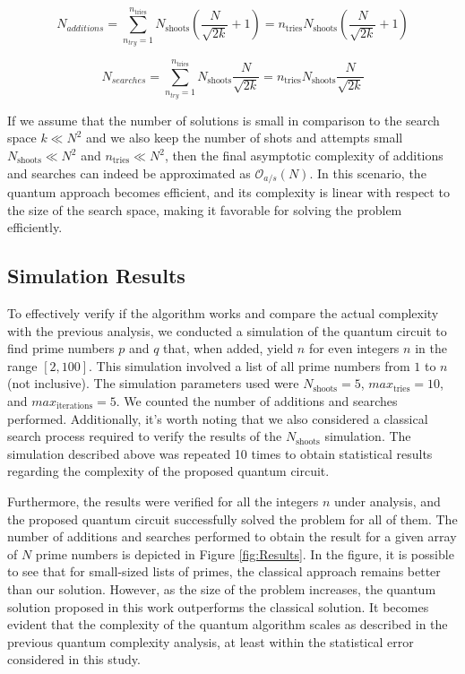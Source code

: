 \documentclass[aps,prapplied,longbibliography]{article}
\begin{document}
    \begin{equation}
        N_{additions} = \sum_{n_{try}=1}^{n_\text{tries}} N_\text{shoots} \left(\frac{N}{\sqrt{2k}} + 1\right) = n_\text{tries} N_\text{shoots} \left(\frac{N}{\sqrt{2k}} + 1\right)
    \end{equation}

    \begin{equation}
        N_{searches} = \sum_{n_{try}=1}^{n_\text{tries}} N_\text{shoots} \frac{N}{\sqrt{2k}} = n_\text{tries} N_\text{shoots} \frac{N}{\sqrt{2k}}
    \end{equation}

    If we assume that the number of solutions is small in comparison to the search space $k\ll N^2$ and we also keep the number of shots and attempts small $N_\text{shoots}\ll N^2$ and $n_\text{tries}\ll N^2$, then the final asymptotic complexity of additions and searches can indeed be approximated as $\mathcal{O}_{a/s}(N)$. In this scenario, the quantum approach becomes efficient, and its complexity is linear with respect to the size of the search space, making it favorable for solving the problem efficiently.

    \subsection{Simulation Results}

    To effectively verify if the algorithm works and compare the actual complexity with the previous analysis, we conducted a simulation of the quantum circuit to find prime numbers $p$ and $q$ that, when added, yield $n$ for even integers $n$ in the range $[2, 100]$. This simulation involved a list of all prime numbers from $1$ to $n$ (not inclusive). The simulation parameters used were $N_\text{shoots}=5$, $max_\text{tries}=10$, and $max_\text{iterations}=5$. We counted the number of additions and searches performed. Additionally, it's worth noting that we also considered a classical search process required to verify the results of the $N_{\text{shoots}}$ simulation. The simulation described above was repeated 10 times to obtain statistical results regarding the complexity of the proposed quantum circuit. 

    Furthermore, the results were verified for all the integers $n$ under analysis, and the proposed quantum circuit successfully solved the problem for all of them. The number of additions and searches performed to obtain the result for a given array of $N$ prime numbers is depicted in Figure \ref{fig:Results}. In the figure, it is possible to see that for small-sized lists of primes, the classical approach remains better than our solution. However, as the size of the problem increases, the quantum solution proposed in this work outperforms the classical solution. It becomes evident that the complexity of the quantum algorithm scales as described in the previous quantum complexity analysis, at least within the statistical error considered in this study.
\end{document}
